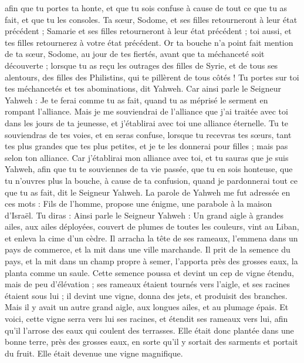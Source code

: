 \begin{multicols}{2}
afin que tu portes ta honte, et que tu sois confuse à cause de tout ce que tu as fait, et que tu les consoles.
Ta sœur, Sodome, et ses filles retourneront à leur état précédent ; Samarie et ses filles retourneront à leur état précédent ; toi aussi, et tes filles retournerez à votre état précédent.
Or ta bouche n'a point fait mention de ta sœur, Sodome, au jour de tes fiertés,
avant que ta méchanceté soit découverte ; lorsque tu as reçu les outrages des filles de Syrie, et de tous ses alentours, des filles des Philistins, qui te pillèrent de tous côtés !
Tu portes sur toi tes méchancetés  et tes abominations, dit Yahweh.
Car ainsi parle le Seigneur Yahweh : Je te ferai comme tu as fait, quand tu as méprisé le serment en rompant l’alliance.
Mais je me souviendrai de l'alliance que j'ai traitée avec toi dans les jours de ta jeunesse, et j'établirai avec toi une alliance éternelle\FTNT{}.
Tu te souviendras de tes voies, et en seras confuse, lorsque tu recevras tes sœurs, tant tes plus grandes que tes plus petites, et je te les donnerai pour filles ; mais pas selon ton alliance.
Car j'établirai mon alliance avec toi, et tu sauras que je suis Yahweh,
afin que tu te souviennes de ta vie passée, que tu en sois honteuse, que tu n'ouvres plus la bouche, à cause de ta confusion, quand je pardonnerai tout ce que tu as fait, dit le Seigneur Yahweh.
\VerseOne{}La parole de Yahweh me fut adressée en ces mots :
Fils de l’homme, propose une énigme, une parabole à la maison d'Israël.
Tu diras : Ainsi parle le Seigneur Yahweh : Un grand aigle à grandes ailes, aux ailes déployées, couvert de plumes de toutes les couleurs, vint au Liban, et enleva la cime d'un cèdre.
Il arracha la tête de ses rameaux, l’emmena dans un pays de commerce, et la mit dans une ville marchande.
Il prit de la semence du pays, et la mit dans un champ propre à semer, l’apporta près des grosses eaux, la planta comme un saule.
Cette semence poussa et devint un cep de vigne étendu, mais de peu d’élévation ; ses rameaux étaient tournés vers l’aigle, et ses racines étaient sous lui ; il devint une vigne, donna des jets, et produisit des branches.
Mais il y avait un autre grand aigle, aux longues ailes, et au plumage épais. Et voici, cette vigne serra vers lui ses racines, et étendit ses rameaux vers lui, afin qu'il l'arrose des eaux qui coulent des terrasses.
Elle était donc plantée dans une bonne terre, près des grosses eaux, en sorte qu'il y sortait des sarments et portait du fruit\FTNT{}. Elle était devenue une vigne magnifique.

\end{multicols}
